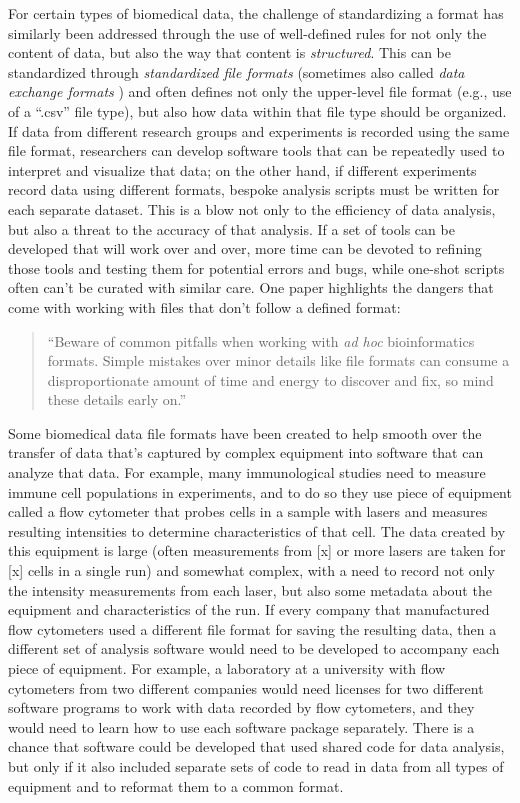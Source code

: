 \documentclass[]{tufte-book}
\begin{document}
For certain types of biomedical data, the challenge of standardizing a format
has similarly been addressed through the use of well-defined rules for not only
the content of data, but also the way that content is \emph{structured}. This can be
standardized through \emph{standardized file formats} (sometimes also called \emph{data
exchange formats} \citep{brazma2006standards}) and often defines not only the
upper-level file format (e.g., use of a ``.csv'' file type), but also how data
within that file type should be organized. If data from different research
groups and experiments is recorded using the same file format, researchers can
develop software tools that can be repeatedly used to interpret and visualize
that data; on the other hand, if different experiments record data using
different formats, bespoke analysis scripts must be written for each separate
dataset. This is a blow not only to the efficiency of data analysis, but also a
threat to the accuracy of that analysis. If a set of tools can be developed that
will work over and over, more time can be devoted to refining those tools and
testing them for potential errors and bugs, while one-shot scripts often can't
be curated with similar care. One paper highlights the dangers that come with
working with files that don't follow a defined format:

\begin{quote}
``Beware of common pitfalls when working with \emph{ad hoc} bioinformatics formats.
Simple mistakes over minor details like file formats can consume a
disproportionate amount of time and energy to discover and fix, so mind these
details early on.'' \citep{buffalo2015bioinformatics}
\end{quote}

Some biomedical data file formats have been created to help smooth over the
transfer of data that's captured by complex equipment into software that can
analyze that data. For example, many immunological studies need to measure
immune cell populations in experiments, and to do so they use piece of
equipment called a flow cytometer that probes cells in a sample with lasers
and measures resulting intensities to determine characteristics of that cell.
The data created by this equipment is large (often measurements from {[}x{]} or more
lasers are taken for {[}x{]} cells in a single run) and somewhat complex, with a need
to record not only the intensity measurements from each laser, but also some metadata
about the equipment and characteristics of the run.
If every company that manufactured flow cytometers used a different file format for
saving the resulting data, then a different set of analysis software would need to
be developed to accompany each piece of equipment. For example, a laboratory at
a university with flow cytometers from two different companies would need licenses
for two different software programs to work with data recorded by flow cytometers,
and they would need to learn how to use each software package separately. There is a
chance that software could be developed that used shared code for data analysis, but only
if it also included separate sets of code to read in data from all types of equipment
and to reformat them to a common format.
\end{document}
